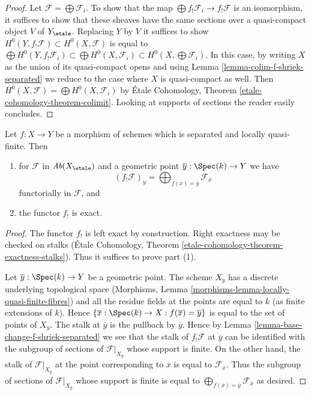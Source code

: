 \begin{proof}
Let $\mathcal{F} = \bigoplus \mathcal{F}_i$. To show that the map
$\bigoplus f_!\mathcal{F}_i \to f_!\mathcal{F}$ is an isomorphism,
it suffices to show that these sheaves have the same sections over
a quasi-compact object $V$ of $Y_\etale$. Replacing $Y$ by $V$
it suffices to show
$H^0(Y, f_!\mathcal{F}) \subset H^0(X, \mathcal{F})$
is equal to
$\bigoplus H^0(Y, f_!\mathcal{F}_i)
\subset \bigoplus H^0(X, \mathcal{F}_i)
\subset H^0(X, \bigoplus \mathcal{F}_i)$.
In this case, by writing $X$ as the union of its quasi-compact opens
and using Lemma \ref{lemma-colim-f-shriek-separated}
we reduce to the case where $X$ is quasi-compact as well.
Then $H^0(X, \mathcal{F}) = \bigoplus H^0(X, \mathcal{F}_i)$
by \'Etale Cohomology, Theorem \ref{etale-cohomology-theorem-colimit}.
Looking at supports of sections the reader easily concludes.
\end{proof}

\begin{lemma}
\label{lemma-lqf-f-shriek-separated-colimits}
Let $f : X \to Y$ be a morphism of schemes which is separated and
locally quasi-finite. Then
\begin{enumerate}
\item for $\mathcal{F}$ in $\textit{Ab}(X_\etale)$ and a geometric
point $\overline{y} : \Spec(k) \to Y$ we have
$$
(f_!\mathcal{F})_{\overline{y}} =
\bigoplus\nolimits_{f(\overline{x}) = \overline{y}} \mathcal{F}_{\overline{x}}
$$
functorially in $\mathcal{F}$, and
\item the functor $f_!$ is exact.
\end{enumerate}
\end{lemma}

\begin{proof}
The functor $f_!$ is left exact by construction. Right exactness may
be checked on stalks
(\'Etale Cohomology, Theorem \ref{etale-cohomology-theorem-exactness-stalks}).
Thus it suffices to prove part (1).

\medskip\noindent
Let $\overline{y} : \Spec(k) \to Y$ be a geometric point.
The scheme $X_{\overline{y}}$ has a discrete underlying
topological space
(Morphisms, Lemma \ref{morphisms-lemma-locally-quasi-finite-fibres})
and all the residue fields at the points are equal to $k$
(as finite extensions of $k$). Hence
$\{\overline{x} : \Spec(k) \to X : f(\overline{x}) = \overline{y}\}$
is equal to the set of points of $X_{\overline{y}}$.
The stalk at $\overline{y}$ is the pullback by $\overline{y}$.
Hence by Lemma \ref{lemma-base-change-f-shriek-separated}
we see that the stalk of $f_!\mathcal{F}$ at $\overline{y}$
can be identified with the subgroup of sections of
$\mathcal{F}|_{X_{\overline{y}}}$ whose support is finite.
On the other hand, the stalk of $\mathcal{F}|_{X_{\overline{y}}}$
at the point corresponding to $\overline{x}$ is equal to
$\mathcal{F}_{\overline{x}}$. Thus the subgroup of sections of
$\mathcal{F}|_{X_{\overline{y}}}$ whose support is finite
is equal to
$\bigoplus_{f(\overline{x}) = \overline{y}} \mathcal{F}_{\overline{x}}$
as desired.
\end{proof}









